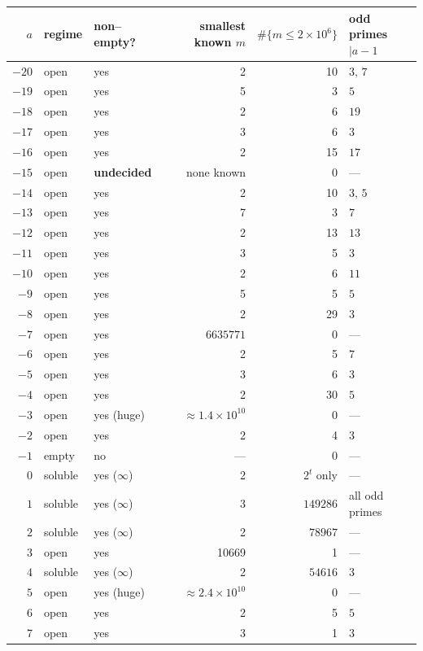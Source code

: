 \documentclass[a4paper]{article}
\theoremstyle{plain}
\theoremstyle{definition}
\theoremstyle{remark}
\begin{document}
\begin{table}[H]
\centering
\footnotesize
\renewcommand{\arraystretch}{1.0}
\begin{tabular}{r l l r r l}
\toprule
$a$ & regime & non--empty? & smallest known $m$ & $\#\{m\le2\!\times\!10^{6}\}$ & odd primes $\mid a-1$\\
\midrule
$-20$ & open & yes & 2 & 10 & $3,\,7$ \\
$-19$ & open & yes & 5 & 3 & $5$ \\
$-18$ & open & yes & 2 & 6 & $19$ \\
$-17$ & open & yes & 3 & 6 & $3$ \\
$-16$ & open & yes & 2 & 15 & $17$ \\
$-15$ & open & \textbf{undecided} & none known & 0 & --- \\
$-14$ & open & yes & 2 & 10 & $3,\,5$ \\
$-13$ & open & yes & 7 & 3 & $7$ \\
$-12$ & open & yes & 2 & 13 & $13$ \\
$-11$ & open & yes & 3 & 5 & $3$ \\
$-10$ & open & yes & 2 & 6 & $11$ \\
$-9$ & open & yes & 5 & 5 & $5$ \\
$-8$ & open & yes & 2 & 29 & $3$ \\
$-7$ & open & yes & $6635771$ & 0 & --- \\
$-6$ & open & yes & 2 & 5 & $7$ \\
$-5$ & open & yes & 3 & 6 & $3$ \\
$-4$ & open & yes & 2 & 30 & $5$ \\
$-3$ & open & yes (huge) & $\approx1.4\times10^{10}$ & 0 & --- \\
$-2$ & open & yes & 2 & 4 & $3$ \\
$-1$ & empty & no & --- & 0 & --- \\
$0$ & soluble & yes ($\infty$) & 2 & $2^{t}$ only & --- \\
$1$ & soluble & yes ($\infty$) & 3 & $149286$ & all odd primes \\
$2$ & soluble & yes ($\infty$) & 2 & $78967$ & --- \\
$3$ & open & yes & 10669 & 1 & --- \\
$4$ & soluble & yes ($\infty$) & 2 & $54616$ & $3$ \\
$5$ & open & yes (huge) & $\approx2.4\times10^{10}$ & 0 & --- \\
$6$ & open & yes & 2 & 5 & $5$ \\
$7$ & open & yes & 3 & 1 & $3$ \\

\end{tabular}
\end{table}
\end{document}
